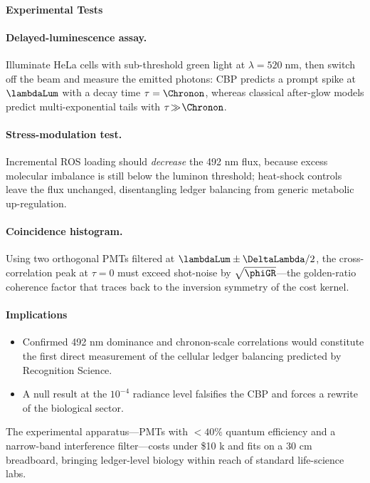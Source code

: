 \documentclass[11pt,oneside]{book}
\begin{document}
{\paragraph{Experimental Tests}

\paragraph{Delayed-luminescence assay.}
Illuminate HeLa cells with sub-threshold green light at
\(\lambda=520\;\text{nm}\), then switch off the beam and measure
the emitted photons:
CBP predicts a prompt spike at \(\lambdaLum\) with a decay time
\(\tau=\Chronon\), whereas classical after-glow models
predict multi-exponential tails with \(\tau\!\gg\!\Chronon\).

\paragraph{Stress-modulation test.}
Incremental ROS loading should
\emph{decrease} the 492 nm flux, because excess molecular imbalance
is still below the luminon threshold;
heat-shock controls leave the flux unchanged,
disentangling ledger balancing from generic metabolic up-regulation.

\paragraph{Coincidence histogram.}
Using two orthogonal PMTs filtered at
\(\lambdaLum\pm\DeltaLambda/2\),
the cross-correlation peak at \(\tau=0\) must exceed shot-noise by
\(\sqrt{\phiGR}\)---the golden-ratio coherence factor that traces back
to the inversion symmetry of the cost kernel.

\paragraph*{Implications}

\begin{itemize}\setlength\itemsep{3pt}
\item Confirmed 492 nm dominance and chronon-scale correlations would
  constitute the first direct measurement of the cellular ledger
  balancing predicted by Recognition Science.
\item A null result at the \(10^{-4}\) radiance level falsifies
  the CBP and forces a rewrite of the biological sector.
\end{itemize}

The experimental apparatus—PMTs with $<40\%$ quantum efficiency and a
narrow-band interference filter—costs under \$10 k and fits on a
30 cm breadboard, bringing ledger-level biology within reach of
standard life-science labs.

}
\end{document}
